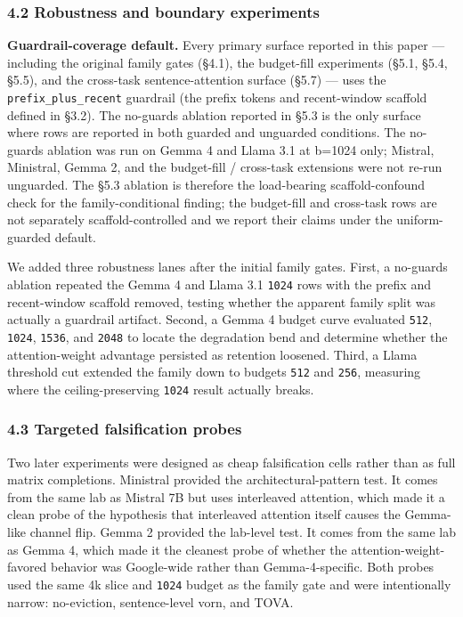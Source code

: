 \documentclass[
]{article}
\begin{document}
\subsubsection{4.2 Robustness and boundary
experiments}\label{42-robustness-and-boundary-experiments}

\textbf{Guardrail-coverage default.} Every primary surface reported in
this paper --- including the original family gates (§4.1), the
budget-fill experiments (§5.1, §5.4, §5.5), and the cross-task
sentence-attention surface (§5.7) --- uses the
\texttt{prefix\_plus\_recent} guardrail (the prefix tokens and
recent-window scaffold defined in §3.2). The no-guards ablation reported
in §5.3 is the only surface where rows are reported in both guarded and
unguarded conditions. The no-guards ablation was run on Gemma 4 and
Llama 3.1 at b=1024 only; Mistral, Ministral, Gemma 2, and the
budget-fill / cross-task extensions were not re-run unguarded. The §5.3
ablation is therefore the load-bearing scaffold-confound check for the
family-conditional finding; the budget-fill and cross-task rows are not
separately scaffold-controlled and we report their claims under the
uniform-guarded default.

We added three robustness lanes after the initial family gates. First, a
no-guards ablation repeated the Gemma 4 and Llama 3.1 \texttt{1024} rows
with the prefix and recent-window scaffold removed, testing whether the
apparent family split was actually a guardrail artifact. Second, a Gemma
4 budget curve evaluated \texttt{512}, \texttt{1024}, \texttt{1536}, and
\texttt{2048} to locate the degradation bend and determine whether the
attention-weight advantage persisted as retention loosened. Third, a
Llama threshold cut extended the family down to budgets \texttt{512} and
\texttt{256}, measuring where the ceiling-preserving \texttt{1024}
result actually breaks.

\subsubsection{4.3 Targeted falsification
probes}\label{43-targeted-falsification-probes}

Two later experiments were designed as cheap falsification cells rather
than as full matrix completions. Ministral provided the
architectural-pattern test. It comes from the same lab as Mistral 7B but
uses interleaved attention, which made it a clean probe of the
hypothesis that interleaved attention itself causes the Gemma-like
channel flip. Gemma 2 provided the lab-level test. It comes from the
same lab as Gemma 4, which made it the cleanest probe of whether the
attention-weight-favored behavior was Google-wide rather than
Gemma-4-specific. Both probes used the same 4k slice and \texttt{1024}
budget as the family gate and were intentionally narrow: no-eviction,
sentence-level vorn, and TOVA.
\end{document}
